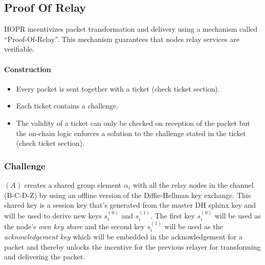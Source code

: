 \subsection{Proof Of Relay}
\label{ProofOfRelay}
HOPR incentivizes packet transformation and delivery using a mechanism called “Proof-Of-Relay”. This mechanism guarantees that nodes relay services are verifiable.
\paragraph{Construction}
\begin{itemize}
    \item Every packet is sent together with a ticket (check ticket section).
    \item Each ticket contains a challenge.
    \item The validity of a ticket can only be checked on reception of the packet but the on-chain logic enforces a solution to the challenge stated in the ticket (check ticket section).
\end{itemize}

\subsubsection{Challenge}
$(A)$ creates a shared group element $\alpha_i$ with all the relay nodes in the channel (B-C-D-Z) by using an offline version of the Diffie-Hellman key exchange. This shared key is a session key that's generated from the master DH sphinx key and will be used to derive new keys $s_i^{(0)}$ and $s_{i}^{(1)}$. 
The first key $s_i^{(0)}$ will be used as the node's \textit{own key share} and the second key $s_i^{(1)}$ will be used as the \textit{acknowledgement key} which will be embedded in the acknowledgement for a packet and thereby unlocks the incentive for the previous relayer for transforming and delivering the packet.
